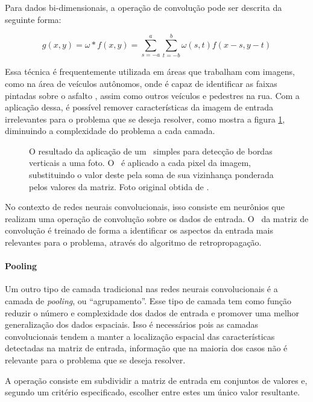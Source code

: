 Para dados bi-dimensionais, a operação de convolução pode ser descrita da seguinte forma:

\begin{equation}
    g(x,y) = \omega * f(x,y) = \sum\limits_{s=-a}^a\sum\limits_{t=-b}^b\omega(s,t)f(x-s, y-t)
\end{equation}

Essa técnica é frequentemente utilizada em áreas que trabalham com imagens, como na área de veículos autônomos, onde é capaz de identificar as faixas pintadas sobre o asfalto \cite{peddagollaLaneDetectionAutonomous}, assim como outros veículos e pedestres na rua.
Com a aplicação dessa, é possível remover características da imagem de entrada irrelevantes para o problema que se deseja resolver, como mostra a figura \ref{fig:conv}, diminuindo a complexidade do problema a cada camada.

\begin{figure}[ht]
    \centering
    
    \caption{O resultado da aplicação de um \ simples para detecção de bordas verticais a uma foto. 
    O \ é aplicado a cada pixel da imagem, substituindo o valor deste pela soma de sua vizinhança ponderada pelos valores da matriz. 
    Foto original obtida de \cite{diliffEnglishLookingEast2015}.}
    \label{fig:conv}
\end{figure}

No contexto de redes neurais convolucionais, isso consiste em neurônios que realizam uma operação de convolução sobre os dados de entrada.
O \ da matriz de convolução é treinado de forma a identificar os aspectos da entrada mais relevantes para o problema, através do algoritmo de retropropagação.

\paragraph{Pooling}
\label{sec:pooling}

Um outro tipo de camada tradicional nas redes neurais convolucionais é a camada de \textit{pooling}, ou ``agrupamento''.
Esse tipo de camada tem como função reduzir o número e complexidade dos dados de entrada e promover uma melhor generalização dos dados espaciais.
Isso é necessários pois as camadas convolucionais tendem a manter a localização espacial das características detectadas na matriz de entrada, informação que na maioria dos casos não é relevante para o problema que se deseja resolver.

A operação consiste em subdividir a matriz de entrada em conjuntos de valores e, segundo um critério especificado, escolher entre estes um único valor resultante.

